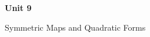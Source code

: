 \documentclass[12pt]{article}
\begin{document}
{\LARGE\bfseries Unit 9\par}
\vspace{3pt}
{\large Symmetric Maps and Quadratic Forms\par}

\end{document}
